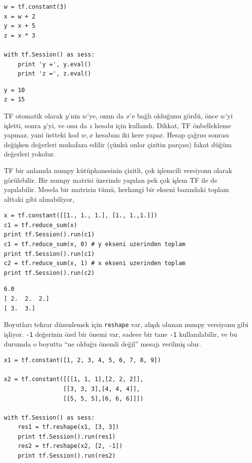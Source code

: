 \documentclass[12pt,fleqn]{article}\usepackage{../../common}
\begin{document}
\begin{verbatim}
w = tf.constant(3)
x = w + 2
y = x + 5
z = x * 3

with tf.Session() as sess:
    print 'y =', y.eval()
    print 'z =', z.eval()
\end{verbatim}

\begin{verbatim}
y = 10
z = 15
\end{verbatim} 

TF otomatik olarak $y$'nin $w$'ye, onun da $x$'e bağlı olduğunu gördü, önce
$w$'yi işletti, sonra $y$'yi, ve onu da $z$ hesabı için kullandı. Dikkat,
TF önbellekleme yapmaz, yani üstteki kod $w,x$ hesabını iki kere
yapar. Hesap çağrısı sonrası değişken değerleri muhafaza edilir (çünkü
onlar çizitin parçası) fakat düğüm değerleri yokolur.

TF bir anlamda numpy kütüphanesinin çizitli, çok işlemcili versiyonu olarak
görülebilir. Bir numpy matrisi üzerinde yapılan pek çok işlem TF ile de
yapılabilir. Mesela bir matrisin tümü, herhangi bir ekseni bazındaki toplam
alttaki gibi alınabiliyor,

\begin{verbatim}
x = tf.constant([[1., 1., 1.], [1., 1.,1.]])
c1 = tf.reduce_sum(x)
print tf.Session().run(c1)
c1 = tf.reduce_sum(x, 0) # y ekseni uzerinden toplam
print tf.Session().run(c1)
c2 = tf.reduce_sum(x, 1) # x ekseni uzerinden toplam
print tf.Session().run(c2)
\end{verbatim}

\begin{verbatim}
6.0
[ 2.  2.  2.]
[ 3.  3.]
\end{verbatim}

Boyutları tekrar düzenlemek için \verb!reshape! var, alışık olunan numpy
versiyonu gibi işliyor. \verb!-1! değerinin özel bir önemi var, sadece bir
tane \verb!-1! kullanılabilir, ve bu durumda o boyutta ``ne olduğu önemli
değil'' mesajı verilmiş olur.

\begin{verbatim}
x1 = tf.constant([1, 2, 3, 4, 5, 6, 7, 8, 9])

x2 = tf.constant([[[1, 1, 1],[2, 2, 2]],
                 [[3, 3, 3],[4, 4, 4]],
                 [[5, 5, 5],[6, 6, 6]]])

with tf.Session() as sess:
    res1 = tf.reshape(x1, [3, 3])
    print tf.Session().run(res1)
    res2 = tf.reshape(x2, [2, -1])
    print tf.Session().run(res2)
\end{verbatim}
\end{document}
